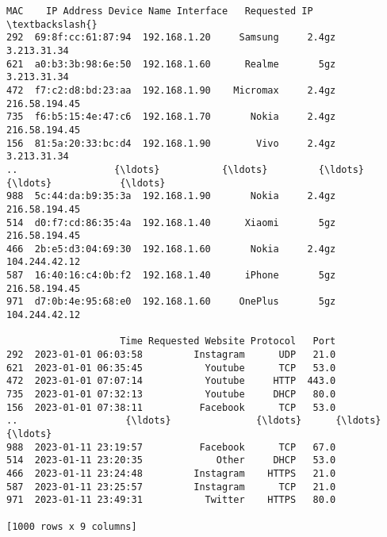 \documentclass[11pt]{article}
\makeatletter
\newcommand{\boxspacing}{\kern\kvtcb@left@rule\kern\kvtcb@boxsep}
\newcommand{\prompt}[4]{
        {\ttfamily\llap{{\color{#2}[#3]:\hspace{3pt}#4}}\vspace{-\baselineskip}}
    }
\makeatother
\begin{document}
            \begin{tcolorbox}[breakable, size=fbox, boxrule=.5pt, pad at break*=1mm, opacityfill=0]
\prompt{Out}{outcolor}{6}{\boxspacing}
\begin{Verbatim}[commandchars=\\\{\}]
                   MAC    IP Address Device Name Interface   Requested IP  \textbackslash{}
292  69:8f:cc:61:87:94  192.168.1.20     Samsung     2.4gz    3.213.31.34
621  a0:b3:3b:98:6e:50  192.168.1.60      Realme       5gz    3.213.31.34
472  f7:c2:d8:bd:23:aa  192.168.1.90    Micromax     2.4gz  216.58.194.45
735  f6:b5:15:4e:47:c6  192.168.1.70       Nokia     2.4gz  216.58.194.45
156  81:5a:20:33:bc:d4  192.168.1.90        Vivo     2.4gz    3.213.31.34
..                 {\ldots}           {\ldots}         {\ldots}       {\ldots}            {\ldots}
988  5c:44:da:b9:35:3a  192.168.1.90       Nokia     2.4gz  216.58.194.45
514  d0:f7:cd:86:35:4a  192.168.1.40      Xiaomi       5gz  216.58.194.45
466  2b:e5:d3:04:69:30  192.168.1.60       Nokia     2.4gz  104.244.42.12
587  16:40:16:c4:0b:f2  192.168.1.40      iPhone       5gz  216.58.194.45
971  d7:0b:4e:95:68:e0  192.168.1.60     OnePlus       5gz  104.244.42.12

                    Time Requested Website Protocol   Port
292  2023-01-01 06:03:58         Instagram      UDP   21.0
621  2023-01-01 06:35:45           Youtube      TCP   53.0
472  2023-01-01 07:07:14           Youtube     HTTP  443.0
735  2023-01-01 07:32:13           Youtube     DHCP   80.0
156  2023-01-01 07:38:11          Facebook      TCP   53.0
..                   {\ldots}               {\ldots}      {\ldots}    {\ldots}
988  2023-01-11 23:19:57          Facebook      TCP   67.0
514  2023-01-11 23:20:35             Other     DHCP   53.0
466  2023-01-11 23:24:48         Instagram    HTTPS   21.0
587  2023-01-11 23:25:57         Instagram      TCP   21.0
971  2023-01-11 23:49:31           Twitter    HTTPS   80.0

[1000 rows x 9 columns]
\end{Verbatim}
\end{tcolorbox}
        
\end{document}
